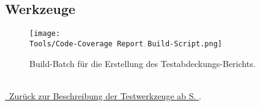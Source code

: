 %



\clearpage





\subsection*{Werkzeuge}



\begin{figure}[ht]

	\centering
	\label{Abb:Werkzeuge:Coverage_Build_Batch}
	
	\texttt{[image: \\Tools/Code-Coverage Report Build-Script.png]}
	
	\caption{Build-Batch für die Erstellung des Testabdeckungs-Berichts.}

\end{figure}

~\\
{\hyperref[Abschnitt:Tests:Werkzeuge]{\mousecursor~Zurück zur Beschreibung der Testwerkzeuge ab S. \pageref{Abschnitt:Tests:Werkzeuge}}.}






